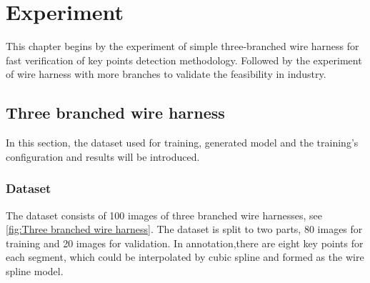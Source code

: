 \chapter{Experiment}
	This chapter begins by the experiment of simple three-branched wire harness for fast verification of key points detection methodology.
	Followed by the experiment of wire harness with more branches to validate the feasibility in industry.
\section{Three branched wire harness}
	In this section, the dataset used for training, generated model and the training's configuration and results will be introduced.
\subsection{Dataset}
	The dataset consists of 100 images of three branched wire harnesses, see \autoref{fig:Three branched wire harness}. The dataset is split to 
	two parts, 80 images for training and 20 images for validation.
	In annotation,there are eight key points for each segment, which could be interpolated by cubic spline and formed as the wire spline model.

